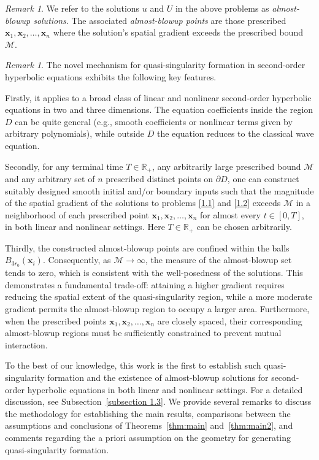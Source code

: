\documentclass[11pt,reqno,oneside]{amsart}
\numberwithin{equation}{section}
\theoremstyle{definition}
\theoremstyle{remark}
\newtheorem{remark}[theorem]{Remark}
\numberwithin{equation}{section}
\begin{document}
	\begin{remark}
		We refer to the solutions $u$ and $U$ in the above problems as {\it almost-blowup solutions}. The associated {\it almost-blowup points} are those prescribed \(\mathbf{x}_1, \mathbf{x}_2, \dots, \mathbf{x}_n\)  where the solution's spatial gradient exceeds the prescribed bound \(\mathcal{M}\).
	\end{remark}
	
	\begin{remark}
		The novel mechanism for quasi-singularity formation in second-order hyperbolic equations exhibits the following key features. 
		
		Firstly, it applies to a broad class of linear and nonlinear second-order hyperbolic equations in two and three dimensions. The equation coefficients inside the region \(D\) can be quite general (e.g., smooth coefficients or nonlinear terms given by arbitrary polynomials), while outside \(D\) the equation reduces to the classical wave equation.
		
		Secondly, for any terminal time $T\in \mathbb R_+$, any {arbitrarily large} prescribed bound \(\mathcal{M}\) and any  {arbitrary} set of \(n\) prescribed distinct points on \(\partial D\), one can construct suitably designed smooth initial and/or boundary inputs such that the magnitude of the spatial gradient of the solutions to problems \eqref{1.1} and \eqref{1.2} exceeds $\mathcal{M}$ in a neighborhood of each prescribed point \(\mathbf{x}_1, \mathbf{x}_2, \dots, \mathbf{x}_n\) for almost every $t \in [0, T]$, in both linear and nonlinear settings. Here $T \in \mathbb R_+$  can be chosen arbitrarily. 
		
		Thirdly, the constructed almost-blowup points are confined within the balls $B_{3r_0}(\mathbf{x}_i)$. Consequently, as $\mathcal{M} \to \infty$, the measure of the almost-blowup set tends to zero, which is consistent with the well-posedness of the solutions. This demonstrates a fundamental trade-off: attaining a higher gradient requires reducing the spatial extent of the quasi-singularity region, while a more moderate gradient permits the almost-blowup region to occupy a larger area. Furthermore, when the prescribed points \(\mathbf{x}_1, \mathbf{x}_2, \dots, \mathbf{x}_n\) are closely spaced, their corresponding almost-blowup regions must be sufficiently constrained to prevent mutual interaction.
	\end{remark}
	
	To the best of our knowledge, this work is the first to establish such quasi-singularity formation and the existence of almost-blowup solutions for second-order hyperbolic equations in both linear and nonlinear settings. For a detailed discussion, see Subsection~\ref{subsection 1.3}. We provide several remarks to discuss the methodology for establishing the main results, comparisons between the assumptions and conclusions of Theorems~\ref{thm:main} and~\ref{thm:main2}, and comments regarding the a priori assumption on the geometry for generating quasi-singularity formation.
	
\end{document}
